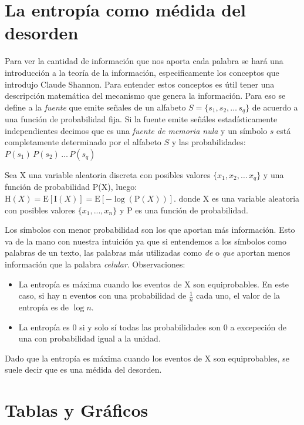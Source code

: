 \section{La entropía como médida del desorden}
\label{sub:entropiaShannon}

Para ver la cantidad de información que nos aporta cada palabra se hará una introducción a la teoría de la información, especificamente
los conceptos que introdujo Claude Shannon\cite{shannon2001mathematical}.
Para entender estos conceptos es útil tener una descripción matemática del mecanismo que genera la información. Para eso se define a 
la \textit{fuente} que emite señales de un alfabeto $ S = \{s_1, s_2, \dots\, s_q\}$ de acuerdo a una función de probabilidad fija.
Si la fuente emite señáles estadísticamente independientes decimos que es una \textit{fuente de memoria nula} y un símbolo $s$ está completamente determinado por el alfabeto $S$ y las probabilidades:
$P(s_1)\,P(s_2)\, \dots\, P(s_q)$

Sea X una variable aleatoria discreta con posibles valores $\{x_1, x_2, \dots\, x_q\}$ y una función de probabilidad P(X), luego:
${\displaystyle \mathrm {H} (X)=\mathrm {E} [\mathrm {I} (X)]=\mathrm {E} [-\log(\mathrm {P} (X))].}$
donde X es una variable aleatoria con posibles valores $\{x_1, ... , x_n\}$ y P es una función de probabilidad.

Los símbolos con menor probabilidad son los que aportan más información. Esto va de la mano con nuestra intuición ya que si entendemos a los símbolos como palabras de un texto, las palabras más utilizadas como \textit{de} o \textit{que} aportan menos información que la palabra \textit{celular}. 
Observaciones:
\begin{itemize}
    \item La entropía es máxima cuando los eventos de X son equiprobables. En este caso, si hay n eventos con una probabilidad de $\frac{1}{n}$ cada uno, el valor de la entropía es de $\log n$.
    \item La entropía es 0 si y solo sí todas las probabilidades son 0 a excepeción de una con probabilidad igual a la unidad. 
\end{itemize}

Dado que la entropía es máxima cuando los eventos de X son equiprobables, se suele decir que es una médida del desorden.


\section{Tablas y Gráficos}
\label{sub:tablas}

